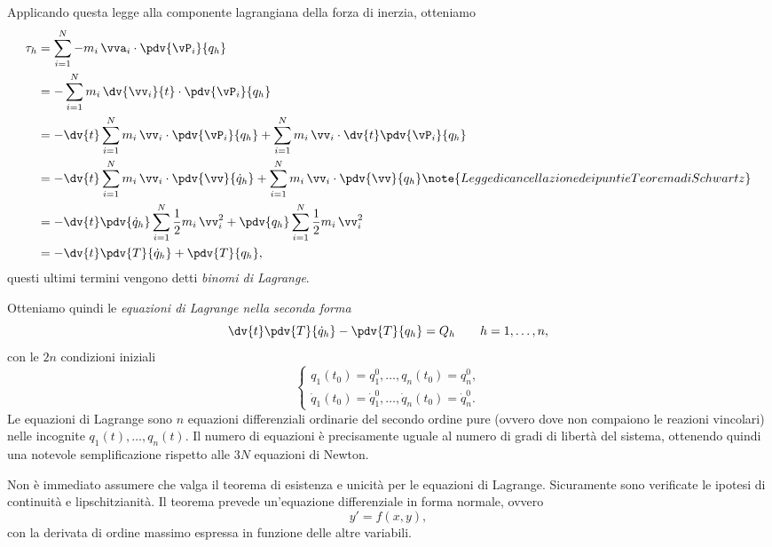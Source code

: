 Applicando questa legge alla componente lagrangiana della forza di inerzia, otteniamo
\begin{align*}
    \tau_h &= \sum_{i=1}^N -m_i\,\vva_i\cdot \pdv{\vP_i}{q_h} \\ 
    &= -\sum_{i=1}^N m_i\,\dv{\vv_i}{t}\cdot \pdv{\vP_i}{q_h} \\
    &= -\dv{t}\sum_{i=1}^N m_i\,\vv_i\cdot \pdv{\vP_i}{q_h} + \sum_{i=1}^N m_i\,\vv_i\cdot \dv{t}\pdv{\vP_i}{q_h} \\
    &= -\dv{t}\sum_{i=1}^N m_i\,\vv_i\cdot \pdv{\vv}{\dot{q}_h} + \sum_{i=1}^N m_i\,\vv_i\cdot \pdv{\vv}{q_h} \note{Legge di cancellazione dei punti e Teorema di Schwartz}\\
    &= -\dv{t}\pdv{\dot{q}_h}\sum_{i=1}^N \frac{1}{2}m_i\,\vv_i^2 + \pdv{q_h}\sum_{i=1}^N \frac{1}{2}m_i\,\vv_i^2 \\
    &= -\dv{t}\pdv{T}{\dot{q}_h} + \pdv{T}{q_h},
\end{align*}
questi ultimi termini vengono detti \emph{binomi di Lagrange}.

Otteniamo quindi le \emph{equazioni di Lagrange nella seconda forma}
\begin{equation*}
    \dv{t}\pdv{T}{\dot{q}_h} - \pdv{T}{q_h} = Q_h \qquad h = 1, \dots, n,
\end{equation*}
con le $2n$ condizioni iniziali
\begin{equation*}
    \begin{cases}
        q_1(t_0)= q_1^0, \dots, q_n(t_0) = q_n^0, \\
        \dot{q}_1(t_0) = \dot{q}_1^0, \dots, \dot{q}_n(t_0) = \dot{q}_n^0.
    \end{cases}
\end{equation*}
Le equazioni di Lagrange sono $n$ equazioni differenziali ordinarie del secondo ordine pure (ovvero dove non compaiono le reazioni vincolari) nelle incognite $q_1(t), \dots, q_n(t)$. Il numero di equazioni è precisamente uguale al numero di gradi di libertà del sistema, ottenendo quindi una notevole semplificazione rispetto alle $3N$ equazioni di Newton.

Non è immediato assumere che valga il teorema di esistenza e unicità per le equazioni di Lagrange. Sicuramente sono verificate le ipotesi di continuità e lipschitzianità. Il teorema prevede un'equazione differenziale in forma normale, ovvero
\begin{equation*}
    y' = f(x, y),
\end{equation*}
con la derivata di ordine massimo espressa in funzione delle altre variabili.

